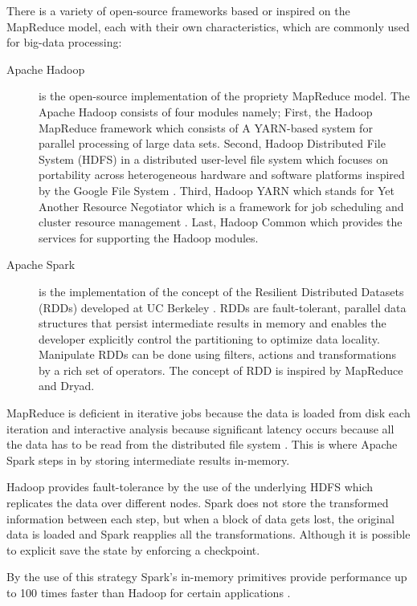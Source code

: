 There is a variety of open-source frameworks based or inspired on the MapReduce model, each with their own characteristics, which are commonly used for big-data processing:
\begin{description}
    \item[Apache Hadoop] is the open-source implementation of the propriety MapReduce model. The Apache Hadoop consists of four modules namely; First, the Hadoop MapReduce framework which consists of A YARN-based system for parallel processing of large data sets. Second, Hadoop Distributed File System (HDFS) in a distributed user-level file system which focuses on portability across heterogeneous hardware and software platforms \cite{5452045} inspired by the Google File System \cite{Ghemawat:2003:GFS:1165389.945450}. Third, Hadoop YARN which stands for Yet Another Resource Negotiator which is a framework for job scheduling and cluster resource management \cite{Vavilapalli:2013:AHY:2523616.2523633}. Last, Hadoop Common which provides the services for supporting the Hadoop modules.
    \item[Apache Spark] is the implementation of the concept of the Resilient Distributed Datasets (RDDs) developed at UC Berkeley \cite{180560}. RDDs are fault-tolerant, parallel data structures that persist intermediate results in memory and enables the developer explicitly control the partitioning to optimize data locality. Manipulate RDDs can be done using filters, actions and transformations by a rich set of operators. The concept of RDD is inspired by MapReduce and Dryad.
\end{description}

MapReduce is deficient in iterative jobs because the data is loaded from disk each iteration and interactive analysis because significant latency occurs because all the data has to be read from the distributed file system \cite{Zaharia:2010:SCC:1863103.1863113}. This is where Apache Spark steps in by storing intermediate results in-memory.

Hadoop provides fault-tolerance by the use of the underlying HDFS which replicates the data over different nodes. Spark does not store the transformed information between each step, but when a block of data gets lost, the original data is loaded and Spark reapplies all the transformations. Although it is possible to explicit save the state by enforcing a checkpoint.

By the use of this strategy Spark's in-memory primitives provide performance up to 100 times faster than Hadoop for certain applications \cite{Xin:2013:SSR:2463676.2465288}.